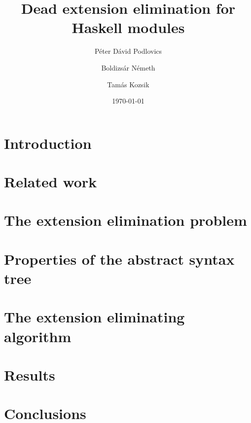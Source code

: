 \documentclass[11pt]{amsart}
\title{Dead extension elimination for Haskell modules}
\date{\today}
\author{Péter Dávid Podlovics}
\author{Boldizsár Németh}
\author{Tamás Kozsik}
\begin{document}
	
	
	\maketitle

	\section{Introduction}
	
	
	\section{Related work}
	
	
	\section{The extension elimination problem} \label{ext-elim_problem}
	
	
	\section{Properties of the abstract syntax tree}
	
	
	\section{The extension eliminating algorithm} \label{algorithm}
	
	
	\section{Results}
	
	
	\section{Conclusions}
	
	
	
	
\end{document}
